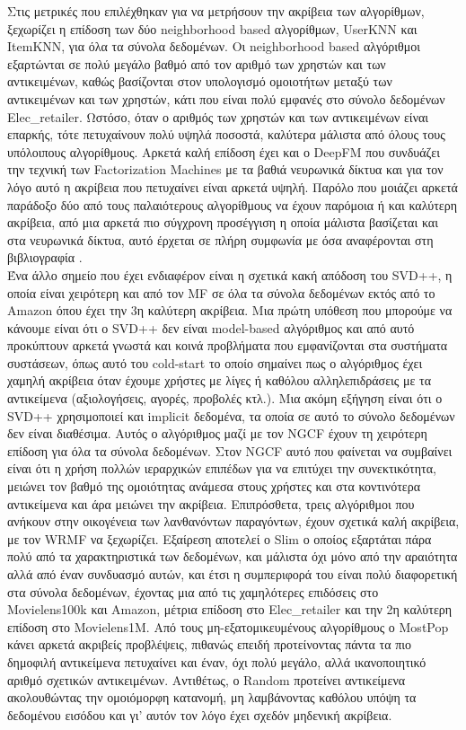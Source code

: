 Στις μετρικές που επιλέχθηκαν για να μετρήσουν την ακρίβεια των αλγορίθμων, ξεχωρίζει η επίδοση των δύο neighborhood based αλγορίθμων, UserKNN και ItemKNN, για όλα τα σύνολα δεδομένων. Οι neighborhood based αλγόριθμοι εξαρτώνται σε πολύ μεγάλο βαθμό από τον αριθμό των χρηστών και των αντικειμένων, καθώς βασίζονται στον υπολογισμό ομοιοτήτων μεταξύ των αντικειμένων και των χρηστών, κάτι που είναι πολύ εμφανές στο σύνολο δεδομένων Elec\_retailer. Ωστόσο, όταν ο αριθμός των χρηστών και των αντικειμένων είναι επαρκής, τότε πετυχαίνουν πολύ υψηλά ποσοστά, καλύτερα μάλιστα από όλους τους υπόλοιπους αλγορίθμους. Αρκετά καλή επίδοση έχει και ο DeepFM που συνδυάζει την τεχνική των Factorization Machines με τα βαθιά νευρωνικά δίκτυα και για τον λόγο αυτό η ακρίβεια που πετυχαίνει είναι αρκετά υψηλή. Παρόλο που μοιάζει αρκετά παράδοξο δύο από τους παλαιότερους αλγορίθμους να έχουν παρόμοια ή και καλύτερη ακρίβεια, από μια αρκετά πιο σύγχρονη προσέγγιση η οποία μάλιστα βασίζεται και στα νευρωνικά δίκτυα, αυτό έρχεται σε πλήρη συμφωνία με όσα αναφέρονται στη βιβλιογραφία \cite{dacremaTroublingAnalysisReproducibility2021}.\\ Ένα άλλο σημείο που έχει ενδιαφέρον είναι η σχετικά κακή απόδοση του SVD++, η οποία είναι χειρότερη και από τον MF σε όλα τα σύνολα δεδομένων εκτός από το Amazon όπου έχει την 3η καλύτερη ακρίβεια. Μια πρώτη υπόθεση που μπορούμε να κάνουμε είναι ότι ο SVD++ δεν είναι model-based αλγόριθμος και από αυτό προκύπτουν αρκετά γνωστά και κοινά προβλήματα που εμφανίζονται στα συστήματα συστάσεων, όπως αυτό του cold-start το οποίο σημαίνει πως ο αλγόριθμος έχει χαμηλή ακρίβεια όταν έχουμε χρήστες με λίγες ή καθόλου αλληλεπιδράσεις με τα αντικείμενα (αξιολογήσεις, αγορές, προβολές κτλ.). Μια ακόμη εξήγηση είναι ότι ο SVD++ χρησιμοποιεί και implicit δεδομένα, τα οποία σε αυτό το σύνολο δεδομένων δεν είναι διαθέσιμα. Αυτός ο αλγόριθμος μαζί με τον NGCF έχουν τη χειρότερη επίδοση για όλα τα σύνολα δεδομένων. Στον NGCF αυτό που φαίνεται να συμβαίνει είναι ότι η χρήση πολλών ιεραρχικών επιπέδων για να επιτύχει την συνεκτικότητα, μειώνει τον βαθμό της ομοιότητας ανάμεσα στους χρήστες και στα κοντινότερα αντικείμενα και άρα μειώνει την ακρίβεια. Επιπρόσθετα, τρεις αλγόριθμοι που ανήκουν στην οικογένεια των λανθανόντων παραγόντων, έχουν σχετικά καλή ακρίβεια, με τον WRMF να ξεχωρίζει. Εξαίρεση αποτελεί ο Slim ο οποίος εξαρτάται πάρα πολύ από τα χαρακτηριστικά των δεδομένων, και μάλιστα όχι μόνο από την αραιότητα αλλά από έναν συνδυασμό αυτών, και έτσι η συμπεριφορά του είναι πολύ διαφορετική στα σύνολα δεδομένων, έχοντας μια από τις χαμηλότερες επιδόσεις στο Movielens100k και Amazon, μέτρια επίδοση στο Elec\_retailer και την 2η καλύτερη επίδοση στο Movielens1M. Από τους μη-εξατομικευμένους αλγορίθμους ο MostPop κάνει αρκετά ακριβείς προβλέψεις, πιθανώς επειδή προτείνοντας πάντα τα πιο δημοφιλή αντικείμενα πετυχαίνει και έναν, όχι πολύ μεγάλο, αλλά ικανοποιητικό αριθμό σχετικών αντικειμένων. Αντιθέτως, ο Random προτείνει αντικείμενα ακολουθώντας την ομοιόμορφη κατανομή, μη λαμβάνοντας καθόλου υπόψη τα δεδομένου εισόδου και γι' αυτόν τον λόγο έχει σχεδόν μηδενική ακρίβεια.\\
